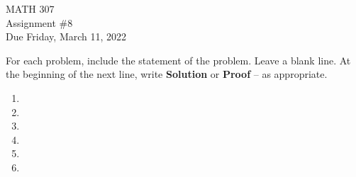 \documentclass[12pt]{article}
\newcommand{\nl}{\vspace{0.1in}\noindent}
\begin{document}
\pagestyle{fancy}
\fancyhf{}

\noindent MATH 307 \\
Assignment \#8 \\  %
Due Friday, March 11, 2022

\nl For each problem, include the statement of the problem. Leave a blank line.  At the beginning of the next line, write \textbf{Solution} or \textbf{Proof} -- as appropriate.

\begin{enumerate}
\item 
\newpage
\item 

\item 

\item 
\newpage
\item 
\newpage
\item 
\end{enumerate}
\end{document}
